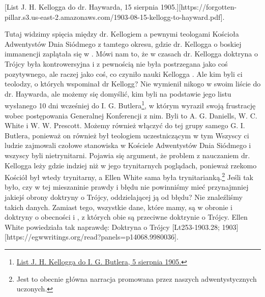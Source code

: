 
[List J. H. Kellogga do dr. Haywarda, 15 sierpnia 1905.][https://forgotten-pillar.s3.us-east-2.amazonaws.com/1903-08-15-kellogg-to-hayward.pdf].

Tutaj widzimy spięcia między dr. Kellogiem a pewnymi teologami Kościoła Adwentystów Dnia Siódmego z tamtego okresu, gdzie  dr. Kellogga o boskiej immanencji zaplątała się w . Mówi nam to, że w czasach dr. Kellogga doktryna o Trójcy była kontrowersyjna i z pewnością nie była postrzegana jako coś pozytywnego, ale raczej jako coś, co czyniło nauki Kellogga . Ale kim byli ci teolodzy, o których wspominał dr Kellogg? Nie wymienił nikogo w swoim liście do dr. Haywarda, ale możemy się domyślić, kim byli  na podstawie jego listu wysłanego 10 dni wcześniej do I. G. Butlera\footnote{\href{https://forgotten-pillar.s3.us-east-2.amazonaws.com/1905-08-05-kellogg-butler.pdf}{List J. H. Kellogga do I. G. Butlera, 5 sierpnia 1905.}}, w którym wyraził swoją frustrację wobec postępowania Generalnej Konferencji z nim. Byli to A. G. Daniells, W. C. White i W. W. Prescott. Możemy również włączyć do tej grupy samego G. I. Butlera, ponieważ on również był teologiem uczestniczącym w tym  Wszyscy ci ludzie zajmowali czołowe stanowiska w Kościele Adwentystów Dnia Siódmego i wszyscy byli nietrynitarni. Pojawia się argument, że problem z nauczaniem dr. Kellogga leży gdzie indziej niż w jego trynitarnych poglądach, ponieważ rzekomo Kościół był wtedy trynitarny, a Ellen White sama była trynitarianką.\footnote{Jest to obecnie główna narracja promowana przez naszych adwentystycznych uczonych.} Jeśli tak było, czy w tej mieszaninie prawdy i błędu nie powinniśmy mieć przynajmniej jakiejś obrony doktryny o Trójcy, oddzielającej ją od błędu? Nie znaleźliśmy takich danych. Zamiast tego, wszystkie dane, które mamy, są w obronie  i doktryny o obecności i , z których obie są przeciwne doktrynie o Trójcy. Ellen White powiedziała tak naprawdę: Doktryna o Trójcy [Lt253-1903.28; 1903][https://egwwritings.org/read?panels=p14068.9980036].

